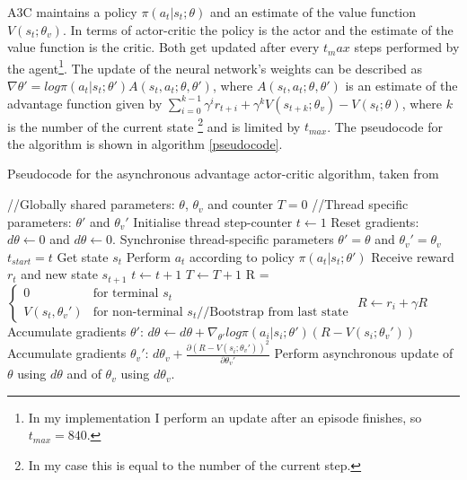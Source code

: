 \documentclass{article}
\begin{document}
A3C maintains a policy $\pi(a_t|s_t;\theta)$ and an estimate of the 
value function $V(s_t;\theta_v)$. In terms of actor-critic the policy is the 
actor and the estimate of the value function is the critic. Both get updated 
after every $t_max$ steps performed by the agent\footnote{In my implementation 
I perform an update after an episode finishes, so $t_{max} = 840$.}. The update 
of the neural network's weights can be described as $\nabla \theta' = log 
\pi(a_t | s_t; \theta') A(s_t, a_t; \theta, \theta')$, where $A(s_t, a_t; 
\theta, \theta')$ is an estimate of the advantage function given by 
$\sum_{i=0}^{k-1} \gamma^i r_{t+i} + \gamma^k V(s_{t+k}; \theta_v) - V(s_t; 
\theta)$, where $k$ is the number of the current state \footnote{In my  case 
this is equal to the number of the current step.} and is limited by $t_{max}$. 
The pseudocode for the algorithm is shown in algorithm \ref{pseudocode}.

\begin{algorithm}
\caption{Pseudocode for the asynchronous advantage actor-critic algorithm, 
taken from \cite{Mnih2016}}
\label{pseudocode}
\begin{algorithmic}
\State //Globally shared parameters: $\theta$, $\theta_v$ and counter $T = 0$
\State //Thread specific parameters: $\theta'$ and $\theta_v'$
\State Initialise thread step-counter $t \gets 1$
\Repeat
\State Reset gradients: $d\theta \gets 0$ and $d\theta \gets 0$.
\State Synchronise thread-specific parameters $\theta' = \theta$ and $\theta_v' 
= \theta_v$ 
\State $t_{start} = t$ 
\State Get state $s_t$ 
\Repeat
\State Perform $a_t$ according to policy $\pi(a_t | s_t; \theta')$
\State Receive reward $r_t$ and new state $s_{t+1}$
\State $t \gets t+1$
\State $T \gets T+1$
\State R = $\begin{cases} 0 & \text{for terminal }s_t \\ V(s_t, \theta_v') & 
    \text{for non-terminal } s_t \text{//Bootstrap from last state} \end{cases}$
\State $R \gets r_i + \gamma R$
\State Accumulate gradients $\theta'$: $d\theta \gets d\theta + 
    \nabla_{\theta'} log \pi(a_i | s_i; \theta') (R - V(s_i; \theta_v'))$
\State Accumulate gradients $\theta_v'$: $d\theta_v + \frac{\partial (R - 
    V(s_i; \theta_v'))^2}{\partial \theta_v'}$
\EndFor
\State Perform asynchronous update of $\theta$ using $d\theta$ and of 
    $\theta_v$ using $d\theta_v$.
\end{algorithmic}
\end{algorithm}
\end{document}
